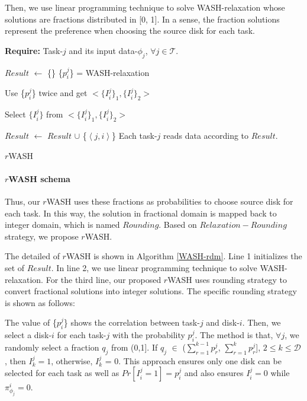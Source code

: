\documentclass[conference]{IEEEtran}
\begin{document}
Then, we use linear programming technique to solve WASH-relaxation whose solutions are fractions distributed in [0, 1]. In a sense, the fraction solutions represent the preference when choosing the source disk for each task. 

 \begin{algorithm}[!t]
 	\textbf{Require:} Task-$j$ and its input data-$\phi_j$, $\forall j \in \mathcal{T}$. %
 	\begin{algorithmic}[1]	
 		\State $Result$ $\gets$ \{\}
 		\State \{$p_i^j$\} = WASH-relaxation		
 		
 		
 		\State Use \{$p_i^j$\} twice and get $<\{I_i^j\}_1, \{I_i^j\}_2 >$
 		
		\State Select $\{I_i^j\}$ from $<\{I_i^j\}_1, \{I_i^j\}_2>$


 			\State $Result$ $\gets$ $Result$ $\cup$ 	
 			\{$\left \langle j, i\right \rangle$\}
 			\EndIf
 		\EndFor	
 		\State Each task-$j$ reads data according to $Result$.
 	\end{algorithmic}
 	\caption{$r$WASH}\label{WASH-rdm}
 \end{algorithm}
 \paragraph{\textbf{$r$WASH schema}} 

Thus, our $r$WASH uses these fractions as probabilities to choose source disk for each task. In this way, the solution in fractional domain is mapped back to integer domain, which is named $Rounding$. 
Based on $Relaxation-Rounding$ strategy, we propose $r$WASH. 

The detailed of $r$WASH is shown in Algorithm \ref{WASH-rdm}. Line 1 initializes the set of $Result$. In line 2, we use linear programming technique to solve WASH-relaxation. For the third line, our proposed $r$WASH uses rounding strategy to convert fractional solutions into integer solutions. The specific rounding strategy is shown as follows:
 
The value of \{$p_i^j$\}  shows the correlation between task-$j$ and disk-$i$. Then, we select a disk-$i$ for each task-$j$ with the probability $p_i^j$. The method is that, $\forall j$, we randomly select a fraction $q_j$ from (0,1]. If $q_j$ $\in$ ($\sum\nolimits_{r = 1}^{k-1} p_{r}^{j}$,  $\sum\nolimits_{r = 1}^{k} p_{r}^{j}$], $2 \leq k \leq \mathcal{D} $, then $I_k^j = 1$, otherwise, $I_k^j$ = 0. This approach ensures only one disk can be selected for each task as well as $Pr[I_i^j = 1] = p_i^j$ and also ensures $I_i^j = 0$ while $\pi_{\phi_j}^i = 0$.
\end{document}
